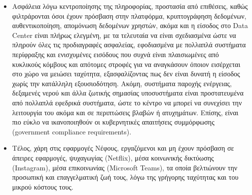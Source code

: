 \documentclass{article}
\begin{document}
\begin{itemize}
\item	Ασφάλεια λόγω κεντροποίησης της πληροφορίας, προστασία από επιθέσεις, καθώς φιλτράρονται όσοι έχουν πρόσβαση στην πλατφόρμα, κρυπτογράφηση δεδομένων, αυθεντικοποίηση, απομόνωση δεδομένων χρηστών, ακόμα και η είσοδος στο Data Center είναι πλήρως ελεγμένη, με τα τελευταία να είναι σχεδιασμένα ώστε να πληρούν όλες τις προδιαγραφές ασφαλείας, εφοδιασμένα με πολλαπλά συστήματα περίφραξης και ενισχυμένες εισόδους που συχνά είναι πλαισιωμένες από κυκλικούς κόμβους και απότομες στροφές για να αναγκάσουν όποιον εισέρχεται στο χώρο να μειώσει ταχύτητα, εξασφαλίζοντας πως δεν είναι δυνατή η είσοδος χωρίς την κατάλληλη εξουσιοδότηση. Ακόμη, συστήματα παροχής ενέργειας, δεξαμενές νερού και άλλα ζωτικής σημασίας υποσυστήματα είναι προστατευμένα από πολλαπλά εφεδρικά συστήματα, ώστε το κέντρο να μπορεί να συνεχίσει την λειτουργία του ακόμα και σε περιπτώσεις βλαβών ή ατυχημάτων. Επίσης, είναι πιο εύκλο να ικανοποιηθούν οι κυβερνητικές απαιτήσεις συμμόρφωσης (government compliance requirements).

\item	Τέλος, χάρη στις εφαρμογές Νέφους, εργαζόμενοι και μη έχουν πρόσβαση σε άπειρες εφαρμογές, ψυχαγωγίας (Netflix), μέσα κοινωνικής δικτύωσης (Instagram), μέσα επικοινωνίας (Microsoft Teams), τα οποία βελτιώνουν την προσωπική και επαγγελματική ζωή τους, λόγω της γρήγορης ταχύτητας και του μικρού κόστους τους.
\end{itemize}
\end{document}

